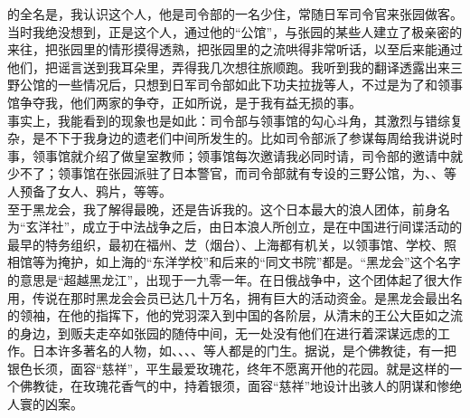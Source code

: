 的全名是，我认识这个人，他是司令部的一名少住，常随日军司令官来张园做客。当时我绝没想到，正是这个人，通过他的“公馆”，与张园的某些人建立了极亲密的来往，把张园里的情形摸得透熟，把张园里的之流哄得非常听话，以至后来能通过他们，把谣言送到我耳朵里，弄得我几次想往旅顺跑。我听到我的翻译透露出来三野公馆的一些情况后，只想到日军司令部如此下功夫拉拢等人，不过是为了和领事馆争夺我，他们两家的争夺，正如所说，是于我有益无损的事。\\

事实上，我能看到的现象也是如此：司令部与领事馆的勾心斗角，其激烈与错综复杂，是不下于我身边的遗老们中间所发生的。比如司令部派了参谋每周给我讲说时事，领事馆就介绍了做皇室教师；领事馆每次邀请我必同时请，司令部的邀请中就少不了；领事馆在张园派驻了日本警官，而司令部就有专设的三野公馆，为、、等人预备了女人、鸦片，等等。\\

至于黑龙会，我了解得最晚，还是告诉我的。这个日本最大的浪人团体，前身名为“玄洋社”，成立于中法战争之后，由日本浪人所创立，是在中国进行间谍活动的最早的特务组织，最初在福州、芝（烟台）、上海都有机关，以领事馆、学校、照相馆等为掩护，如上海的“东洋学校”和后来的“同文书院”都是。“黑龙会”这个名字的意思是“超越黑龙江”，出现于一九零一年。在日俄战争中，这个团体起了很大作用，传说在那时黑龙会会员已达几十万名，拥有巨大的活动资金。是黑龙会最出名的领袖，在他的指挥下，他的党羽深入到中国的各阶层，从清末的王公大臣如之流的身边，到贩夫走卒如张园的随侍中间，无一处没有他们在进行着深谋远虑的工作。日本许多著名的人物，如、、、、等人都是的门生。据说，是个佛教徒，有一把银色长须，面容“慈祥”，平生最爱玫瑰花，终年不愿离开他的花园。就是这样的一个佛教徒，在玫瑰花香气的中，持着银须，面容“慈祥”地设计出骇人的阴谋和惨绝人寰的凶案。\\

